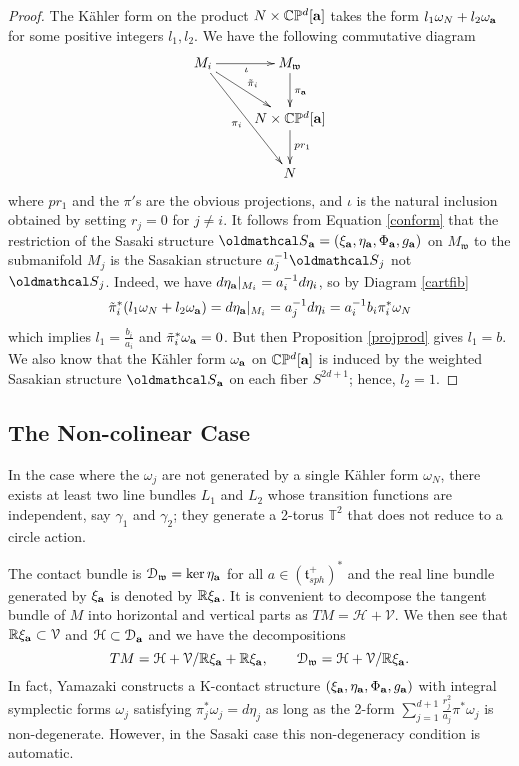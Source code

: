 \documentclass[12pt]{amsart}
\def\bbc{{\mathbb C}}
\def\bbp{{\mathbb P}}
\def\bbr{{\mathbb R}}
\def\bbt{{\mathbb T}}
\def\grg{\gamma}
\def\gri{\iota}
\def\gro{\omega}
\def\bfa{{\bf a}}
\def\cald{{\mathcal D}}
\def\calh{{\mathcal H}}
\def\cals{{\oldmathcal S}}
\def\calv{{\mathcal V}}
\def\gt{{\mathfrak t}}
\def\gw{{\mathfrak w}}
\def\tpi{\tilde{\pi}}
\begin{document}
\begin{proof}
The K\"ahler form on the product $N\times \bbc\bbp^d[\bfa]$ takes the form $l_1\gro_N+l_2\gro_\bfa$ for some positive integers $l_1,l_2$. We have the following commutative diagram
\begin{equation}\label{cartfib}
\xymatrix{
M_i \ar[ddr]_{\pi_i} \ar[dr]^{\tpi_i} \ar[r]_\gri  & M_\gw \ar[d]^{\pi_\bfa}  \\
& N\times \bbc\bbp^d[\bfa] \ar[d]^{pr_1}  \\
& N}
\end{equation}
where $pr_1$ and the $\pi'$s are the obvious projections, and $\gri$ is the natural inclusion obtained by setting $r_j=0$ for $j\neq i$. It follows from Equation \eqref{conform} that the restriction of the Sasaki structure $\cals_\bfa=(\xi_\bfa,\eta_\bfa,\Phi_\bfa,g_\bfa)$ on $M_\gw$ to the submanifold $M_j$ is the Sasakian  structure $a_j^{-1}\cals_j$ not $\cals_j$. Indeed, we have $d\eta_\bfa|_{M_i}=a_i^{-1}d\eta_i$, so by Diagram \eqref{cartfib}
$$\tpi_i^*(l_1\gro_N+l_2\gro_\bfa)=d\eta_\bfa|_{M_i}=a_j^{-1}d\eta_i =a_i^{-1}b_i \pi_i^*\gro_N$$
which implies $l_1=\frac{b_i}{a_i}$ and $\tpi_i^*\gro_\bfa=0$. But then Proposition \ref{projprod} gives $l_1=b$. We also know that the K\"ahler form $\gro_\bfa$ on $\bbc\bbp^d[\bfa]$ is induced by the weighted Sasakian structure $\cals_\bfa$ on each fiber $S^{2d+1}$; hence, $l_2=1$.

\end{proof}


\subsection{The Non-colinear Case}
In the case where the $\gro_j$ are not generated by a single K\"ahler form $\gro_N$, there exists at least two line bundles $L_1$ and $L_2$ whose transition functions are independent, say $\grg_1$ and $\grg_2$; they generate a 2-torus $\bbt^2$ that does not reduce to a circle action.


The contact bundle is $\cald_\gw=\ker\eta_\bfa$ for all $a\in (\gt^+_{sph})^*$ and the real line bundle generated by $\xi_\bfa$ is denoted by $\bbr\xi_\bfa$. It is convenient to decompose the tangent bundle of $M$ into horizontal and vertical parts as $TM=\calh + \calv$. We then see that 
$\bbr\xi_\bfa\subset \calv$ and $\calh\subset \cald_\bfa$ and we have the decompositions
$$TM=\calh+\calv/\bbr\xi_\bfa+\bbr\xi_\bfa,\qquad \cald_\gw=\calh+\calv/\bbr\xi_\bfa.$$
In fact, Yamazaki constructs a K-contact structure $(\xi_\bfa,\eta_\bfa,\Phi_\bfa,g_\bfa)$ with integral symplectic forms $\gro_j$ satisfying $\pi_j^*\gro_j=d\eta_j$ as long as the 2-form $\sum_{j=1}^{d+1}\frac{r_j^2}{a_j}\pi^*\gro_j$ is non-degenerate. However, in the Sasaki case this non-degeneracy condition is automatic.
\end{document}
